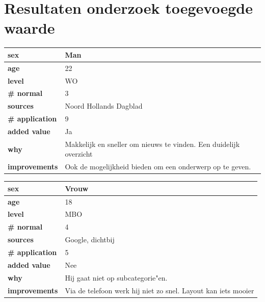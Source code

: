 \documentclass[twoside,openright]{uva-bachelor-thesis}
\begin{document}
\chapter{Resultaten onderzoek toegevoegde waarde}
\label{app:results_res}
\begin{table}
	\centering
	\begin{tabular}{|l|l|}
		\hline
		\textbf{sex} & Man \\ \hline
		\textbf{age} & 22 \\ \hline
		\textbf{level} & WO \\ \hline
		\textbf{\# normal} & 3 \\ \hline
		\textbf{sources} & Noord Hollands Dagblad \\ \hline
		\textbf{\# application} & 9 \\ \hline
		\textbf{added value} & Ja \\ \hline
		\textbf{why} & Makkelijk en sneller om nieuws te vinden.
		Een duidelijk overzicht\\ \hline
		
		\textbf{improvements} & Ook de mogelijkheid bieden om een onderwerp op te geven. \\ \hline
	\end{tabular}
\end{table}
\begin{table}
	\centering
	\begin{tabular}{|l|l|}
		\hline
		\textbf{sex} & Vrouw \\ \hline
		\textbf{age} & 18 \\ \hline
		\textbf{level} & MBO \\ \hline
		\textbf{\# normal} & 4 \\ \hline
		\textbf{sources} & Google, dichtbij
		 \\ \hline
		\textbf{\# application} & 5 \\ \hline
		\textbf{added value} & Nee \\ \hline
		\textbf{why} & Hij gaat niet op subcategorie"en. \\ \hline
		\textbf{improvements} & Via de telefoon werk hij niet zo snel.
		Layout kan iets mooier
		 \\ \hline
	\end{tabular}
\end{table}
\end{document}

